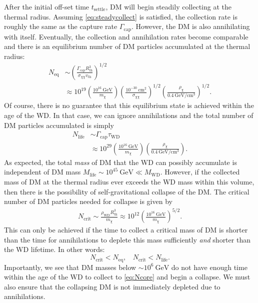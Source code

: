 \documentclass[preprintnumbers,amsmath,amssymb,prd,superscriptaddress]{revtex4}
\newcommand{\GeV}{\text{GeV}}
\newcommand{\cm}{\text{cm}}
\def\r{\right)}
\def\l{\left(}
\begin{document}
After the initial off-set time $t_\text{settle}$, DM will begin steadily collecting at the thermal radius.
Assuming \eqref{eq:steadycollect} is satisfied, the collection rate is roughly the same as the capture rate $\Gamma_\text{cap}$. 
However, the DM is also annihilating with itself.
Eventually, the collection and annihilation rates become comparable and there is an equilibrium number of DM particles accumulated at the thermal radius:
\begin{align}
N_\text{eq} &\sim \l \frac{\Gamma_\text{cap} R_\text{th}^3}{\sigma_{\chi \chi} v_\text{th}} \r^{1/2} \\
&\approx 10^{19} \l \frac{10^{16} ~\GeV}{m_\chi} \r \l \frac{10^{-30} ~\cm^2}{\sigma_{\chi \chi}} \r^{1/2} \l \frac{\rho_\chi}{0.4 ~\GeV/\cm^3} \r^{1/2}.
\end{align}
Of course, there is no guarantee that this equilibrium state is achieved within the age of the WD. 
In that case, we can ignore annihilations and the total number of DM particles accumulated is simply
\begin{align}
N_\text{life} &\sim \Gamma_\text{cap} \tau_\text{WD} \\
&\approx 10^{29}  \l \frac{10^{16} ~\GeV}{m_\chi} \r \l \frac{\rho_\chi}{0.4 ~\GeV/\cm^3} \r. \nonumber
\end{align}
As expected, the total \emph{mass} of DM that the WD can possibly accumulate is independent of DM mass $M_\text{life} \sim 10^{45} ~\GeV \ll M_\text{WD}$. 
However, if the collected mass of DM at the thermal radius ever exceeds the WD mass within this volume, then there is the possibility of self-gravitational collapse of the DM.
The critical number of DM particles needed for collapse is given by
\begin{align}
\label{eq:Ncore}
    N_\text{crit} \sim \frac{\rho_\text{WD} R^3_\text{th}}{m_\chi} \approx 10^{12} \l \frac{10^{16} ~\GeV}{m_\chi} \r^{5/2}. \nonumber
\end{align}
This can only be achieved if the time to collect a critical mass of DM is shorter than the time for annihilations to deplete this mass sufficiently \emph{and} shorter than the WD lifetime. 
In other words:
\begin{equation}
\label{eq:collapsecondition}
N_\text{crit} < N_\text{eq}, ~~~~ N_\text{crit} < N_\text{life}.
\end{equation}
Importantly, we see that DM masses below $\sim 10^{6} ~\GeV$ do not have enough time within the age of the WD to collect to \eqref{eq:Ncore} and begin a collapse. 
We must also ensure that the collapsing DM is not immediately depleted due to annihilations.
\end{document}
